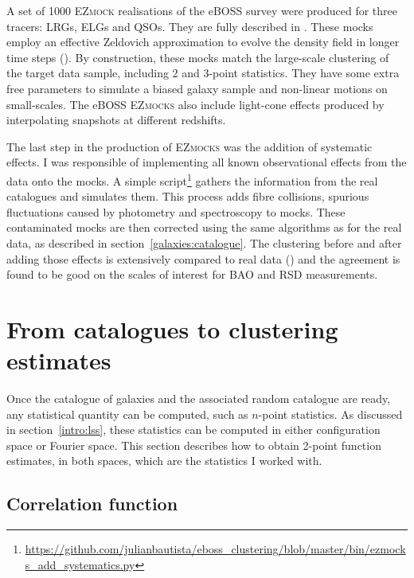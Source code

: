 A set of 1000 \textsc{EZmock} realisations of the eBOSS survey were produced for three tracers:
LRGs, ELGs and QSOs. 
They are fully described in \cite{zhaoCompletedSDSSIVExtended2021}. 
These mocks employ an effective Zeldovich approximation to evolve 
the density field in longer time steps (\cite{chuangEZmocksExtendingZel2015}). 
By construction, these mocks match the large-scale clustering 
of the target data sample, including 2 and 3-point statistics. 
They have some extra free parameters to simulate a biased galaxy sample and non-linear motions on small-scales.  
The eBOSS \textsc{EZmocks} also include light-cone effects produced by interpolating snapshots
at different redshifts. 

The last step in the production of \textsc{EZmocks} was the addition of systematic effects. 
I was responsible of implementing all known observational effects from the data onto the mocks. 
A simple script\footnote{\url{https://github.com/julianbautista/eboss_clustering/blob/master/bin/ezmocks_add_systematics.py}}
gathers the information from the real catalogues and simulates them. 
This process adds fibre collisions, spurious 
fluctuations caused by photometry and spectroscopy to mocks. 
These contaminated mocks are then corrected using the same algorithms as for the real data, 
as described in section~\ref{galaxies:catalogue}. The clustering before and after adding 
those effects is extensively compared to real data (\cite{zhaoCompletedSDSSIVExtended2021}) 
and the agreement is found to be good on the scales of interest for BAO and RSD measurements. 



\section{From catalogues to clustering estimates}
\label{galaxies:clustering}

Once the catalogue of galaxies and the associated random catalogue are ready, 
any statistical quantity can be computed, such as $n$-point statistics. 
As discussed in section~\ref{intro:lss}, these statistics can be computed 
in either configuration space or Fourier space. 
This section describes how to obtain 2-point function estimates, 
in both spaces, which are the statistics I worked with. 

\subsection{Correlation function}
\label{galaxies:clustering:correlation_function}

